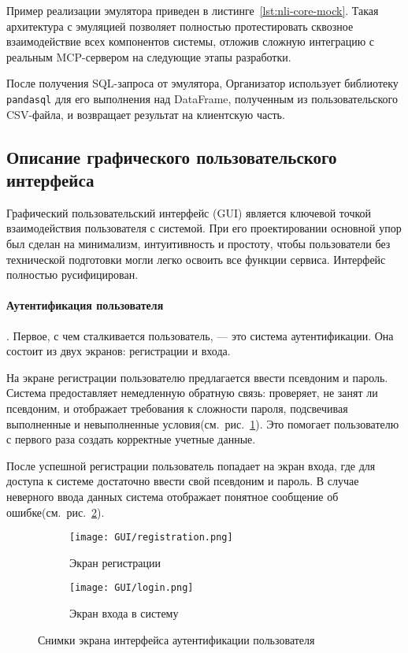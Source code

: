 Пример реализации эмулятора приведен в листинге~\ref{lst:nli-core-mock}. Такая архитектура
с эмуляцией позволяет полностью протестировать сквозное взаимодействие всех компонентов системы,
отложив сложную интеграцию с реальным MCP-сервером на следующие этапы разработки.

После получения SQL-запроса от эмулятора, Организатор использует библиотеку \verb|pandasql|
для его выполнения над DataFrame, полученным из пользовательского CSV-файла, и
возвращает результат на клиентскую часть.




\subsection{Описание графического пользовательского интерфейса}

Графический пользовательский интерфейс (GUI) является ключевой точкой взаимодействия пользователя с
системой. При его проектировании основной упор был сделан на минимализм, интуитивность и простоту,
чтобы пользователи без технической подготовки могли легко освоить все функции сервиса. Интерфейс
полностью русифицирован.


\paragraph{Аутентификация пользователя}. Первое, с чем сталкивается пользователь, — это система
аутентификации. Она состоит из двух экранов: регистрации и входа.

На экране регистрации пользователю предлагается ввести псевдоним и пароль. Система предоставляет
немедленную обратную связь: проверяет, не занят ли псевдоним, и отображает требования к сложности
пароля, подсвечивая выполненные и невыполненные условия(см.~рис.~\ref{fig:registration}). Это помогает
пользователю с первого раза создать корректные учетные данные.

После успешной регистрации пользователь попадает на экран входа, где для доступа к системе достаточно
ввести свой псевдоним и пароль. В случае неверного ввода данных система отображает понятное сообщение
об ошибке(см.~рис.~\ref{fig:login}).

\begin{figure}[ht]
      \centering
      \begin{subfigure}[b]{0.48\textwidth}
            \centering
            \texttt{[image: GUI/registration.png]}
            \caption{Экран регистрации}
            \label{fig:registration}
      \end{subfigure}
      \hfill
      \begin{subfigure}[b]{0.48\textwidth}
            \centering
            \texttt{[image: GUI/login.png]}
            \caption{Экран входа в систему}
            \label{fig:login}
      \end{subfigure}
      \caption{Снимки экрана интерфейса аутентификации пользователя}
      \label{fig:auth_screens}
\end{figure}


